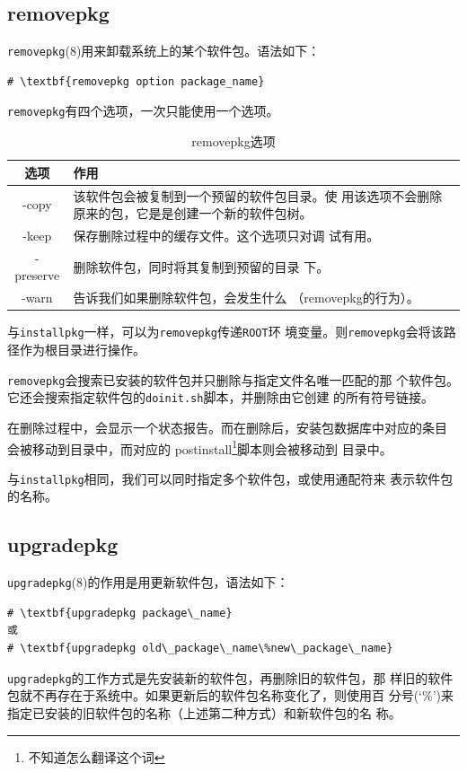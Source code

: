 \subsection{removepkg}
\label{sec:packageManagement:utilities:removepkg}
\texttt{removepkg}(8)用来卸载系统上的某个软件包。语法如下：
\begin{Verbatim}[frame=single, commandchars=\\\{\}]
# \textbf{removepkg option package_name}
\end{Verbatim}
\texttt{removepkg}有四个选项，一次只能使用一个选项。
\begin{table}[htpb]
  \centering
  \begin{tabular}{c|l}
    \hline \hline
    选项 & 作用 \\ \hline
    -copy & \parbox[t]{12cm}{该软件包会被复制到一个预留的软件包目录。使
      用该选项不会删除原来的包，它是是创建一个新的软件包树。}\\
    -keep & \parbox[t]{12cm}{保存删除过程中的缓存文件。这个选项只对调
      试有用。} \\
    -preserve & \parbox[t]{12cm}{删除软件包，同时将其复制到预留的目录
      下。}\\
    -warn & \parbox[t]{12cm}{告诉我们如果删除软件包，会发生什么
      （removepkg的行为）。}\\
    \hline\hline
  \end{tabular}
  \caption{removepkg选项}
  \label{tab:removepkg-options}
\end{table}
与\texttt{installpkg}一样，可以为\texttt{removepkg}传递\texttt{ROOT}环
境变量。则\texttt{removepkg}会将该路径作为根目录进行操作。

\texttt{removepkg}会搜索已安装的软件包并只删除与指定文件名唯一匹配的那
个软件包。它还会搜索指定软件包的\texttt{doinit.sh}脚本，并删除由它创建
的所有符号链接。

在删除过程中，会显示一个状态报告。而在删除后，安装包数据库中对应的条目
会被移动到目录中，而对应的
postinstall\footnote{不知道怎么翻译这个词}脚本则会被移动到
目录中。

与\texttt{installpkg}相同，我们可以同时指定多个软件包，或使用通配符来
表示软件包的名称。

\subsection{upgradepkg}
\label{sec:packageManagement:utilities:upgradepkg}
\texttt{upgradepkg}(8)的作用是用更新软件包，语法如下：
\begin{Verbatim}[frame=single, commandchars=\\\{\}]
# \textbf{upgradepkg package\_name}
或
# \textbf{upgradepkg old\_package\_name\%new\_package\_name}
\end{Verbatim}
\texttt{upgradepkg}的工作方式是先安装新的软件包，再删除旧的软件包，那
样旧的软件包就不再存在于系统中。如果更新后的软件包名称变化了，则使用百
分号(`\%')来指定已安装的旧软件包的名称（上述第二种方式）和新软件包的名
称。


